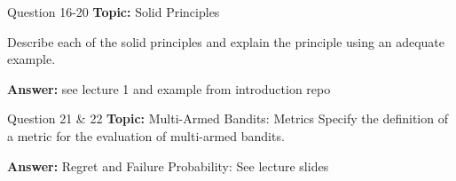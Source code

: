 \begin{frame}{Question 16-20}
    \textbf{Topic:} Solid Principles

    Describe each of the solid principles and explain the principle using an adequate example. 
    \vspace{20pt}

    \textbf{Answer:} see lecture 1 and example from introduction repo
\end{frame}

\begin{frame}{Question 21 \& 22}
    \textbf{Topic:} Multi-Armed Bandits: Metrics
    \vspace{10pt}
    Specify the definition of a metric for the evaluation of multi-armed bandits.
    \vspace{20pt}

    \textbf{Answer:} Regret and Failure Probability: See lecture slides
\end{frame}

    







